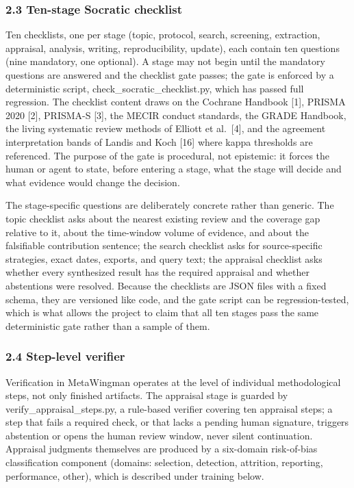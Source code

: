 \documentclass[
]{article}
\begin{document}
\subsubsection{2.3 Ten-stage Socratic
checklist}\label{ten-stage-socratic-checklist}

Ten checklists, one per stage (topic, protocol, search, screening,
extraction, appraisal, analysis, writing, reproducibility, update), each
contain ten questions (nine mandatory, one optional). A stage may not
begin until the mandatory questions are answered and the checklist gate
passes; the gate is enforced by a deterministic script,
check\_socratic\_checklist.py, which has passed full regression. The
checklist content draws on the Cochrane Handbook {[}1{]}, PRISMA 2020
{[}2{]}, PRISMA-S {[}3{]}, the MECIR conduct standards, the GRADE
Handbook, the living systematic review methods of Elliott et
al.~{[}4{]}, and the agreement interpretation bands of Landis and Koch
{[}16{]} where kappa thresholds are referenced. The purpose of the gate
is procedural, not epistemic: it forces the human or agent to state,
before entering a stage, what the stage will decide and what evidence
would change the decision.

The stage-specific questions are deliberately concrete rather than
generic. The topic checklist asks about the nearest existing review and
the coverage gap relative to it, about the time-window volume of
evidence, and about the falsifiable contribution sentence; the search
checklist asks for source-specific strategies, exact dates, exports, and
query text; the appraisal checklist asks whether every synthesized
result has the required appraisal and whether abstentions were resolved.
Because the checklists are JSON files with a fixed schema, they are
versioned like code, and the gate script can be regression-tested, which
is what allows the project to claim that all ten stages pass the same
deterministic gate rather than a sample of them.

\subsubsection{2.4 Step-level verifier}\label{step-level-verifier}

Verification in MetaWingman operates at the level of individual
methodological steps, not only finished artifacts. The appraisal stage
is guarded by verify\_appraisal\_steps.py, a rule-based verifier
covering ten appraisal steps; a step that fails a required check, or
that lacks a pending human signature, triggers abstention or opens the
human review window, never silent continuation. Appraisal judgments
themselves are produced by a six-domain risk-of-bias classification
component (domains: selection, detection, attrition, reporting,
performance, other), which is described under training below.
\end{document}
